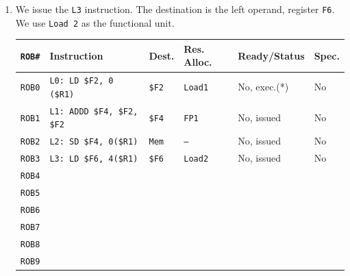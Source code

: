 \begin{enumerate}
    
    \newpage


    \item We issue the \texttt{L3} instruction. The destination is the left operand, register \texttt{F6}. We use \texttt{Load 2} as the functional unit.
    \begin{table}[!htp]
        \centering
        \begin{adjustbox}{width={\textwidth},totalheight={\textheight},keepaspectratio}
            \begin{tabular}{@{} l l l l l l @{}}
                \toprule
                \texttt{ROB\#}  & \textbf{Instruction} & \textbf{Dest.} & \textbf{Res. Alloc.} & \textbf{Ready/Status} & \textbf{Spec.} \\
                \midrule
                \texttt{ROB0}   & \texttt{L0: LD \$F2, 0 (\$R1)}    & \texttt{\$F2} & \texttt{Load1}    & No, exec.(*)  & No    \\ [.3em]
                \texttt{ROB1}   & \texttt{L1: ADDD \$F4, \$F2, \$F2}& \texttt{\$F4} & \texttt{FP1}      & No, issued    & No    \\ [.3em]
                \texttt{ROB2}   & \texttt{L2: SD \$F4, 0(\$R1)}     & \texttt{Mem}  & \texttt{--}       & No, issued    & No    \\ [.3em]
                \texttt{ROB3}   & \texttt{L3: LD \$F6, 4(\$R1)}     & \texttt{\$F6} & \texttt{Load2}    & No, issued    & No    \\ [.3em]
                \texttt{ROB4}   &                                   &               &                   &               &       \\ [.3em]
                \texttt{ROB5}   &                                   &               &                   &               &       \\ [.3em]
                \texttt{ROB6}   &                                   &               &                   &               &       \\ [.3em]
                \texttt{ROB7}   &                                   &               &                   &               &       \\ [.3em]
                \texttt{ROB8}   &                                   &               &                   &               &       \\ [.3em]
                \texttt{ROB9}   &                                   &               &                   &               &       \\
                \bottomrule
            \end{tabular}

\end{adjustbox}
\end{table}
\end{enumerate}
